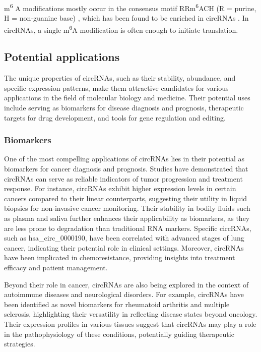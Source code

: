 m\textsuperscript{6}
A modifications mostly occur in the consensus motif RRm\textsuperscript{6}ACH
(R = purine, H = non-guanine base)
\supercite{csepany_sequence_1990,harper_sequence_1990}, which has been found to
be enriched in circRNAs \supercite{yang_extensive_2017}.
In circRNAs, a single m\textsuperscript{6}A modification is often enough to
initiate translation\supercite{yang_extensive_2017}.

\subsection{Potential applications}
\label{sec:circrna_applications}
The unique properties of circRNAs, such as their stability, abundance, and
specific expression patterns, make them attractive candidates for various
applications in the field of molecular biology and medicine.
Their potential uses include serving as biomarkers for disease diagnosis and
prognosis, therapeutic targets for drug development, and tools for gene
regulation and editing.

\subsubsection{Biomarkers}
One of the most compelling applications of circRNAs lies in their potential as
biomarkers for cancer diagnosis and prognosis.
Studies have demonstrated that circRNAs can serve as reliable indicators of
tumor progression and treatment response.
For instance, circRNAs exhibit higher expression levels in certain cancers
compared to their linear counterparts, suggesting their utility in liquid
biopsies for non-invasive cancer
monitoring\supercite{bao_prognostic_2020,ren_construction_2017}.
Their stability in bodily fluids such as plasma and saliva further enhances
their applicability as biomarkers, as they are less prone to degradation than
traditional RNA markers\supercite{bao_prognostic_2020,zhang_circular_2018}.
Specific circRNAs, such as hsa\_circ\_0000190, have been correlated with
advanced stages of lung cancer, indicating their potential role in clinical
settings\supercite{luo_plasma_2020}.
Moreover, circRNAs have been implicated in chemoresistance, providing insights
into treatment efficacy and patient
management\supercite{geng_function_2018,feng_functions_2019}.

Beyond their role in cancer, circRNAs are also being explored in the context of
autoimmune diseases and neurological disorders.
For example, circRNAs have been identified as novel biomarkers for rheumatoid
arthritis and multiple sclerosis, highlighting their versatility in reflecting
disease states beyond
oncology\supercite{ouyang_identification_2021,he_exosomal_2019}.
Their expression profiles in various tissues suggest that circRNAs may play a
role in the pathophysiology of these conditions, potentially guiding
therapeutic strategies\supercite{mohammed_circular_2023}.


